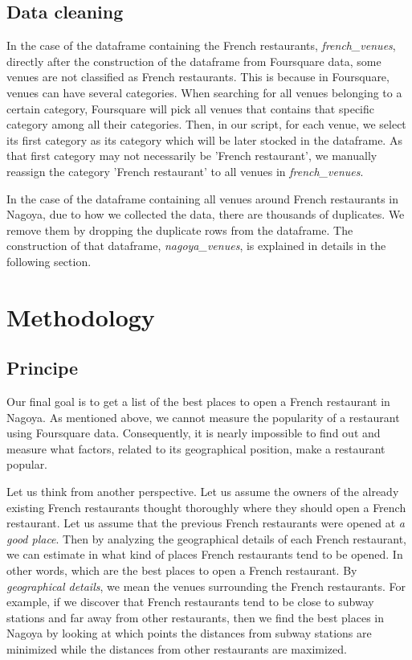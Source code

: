 \documentclass[12pt,a4paper]{article}
\begin{document}
\subsection{Data cleaning}

In the case of the dataframe containing the French restaurants, \textit{french\_venues}, directly after the construction of the dataframe from Foursquare data, some venues are not classified as French restaurants. This is because in Foursquare, venues can have several categories. When searching for all venues belonging to a certain category, Foursquare will pick all venues that contains that specific category among all their categories. Then, in our script, for each venue, we select its first category as its category which will be later stocked in the dataframe. As that first category may not necessarily be 'French restaurant', we manually reassign the category 'French restaurant' to all venues in \textit{french\_venues}.

\medskip

In the case of the dataframe containing all venues around French restaurants in Nagoya, due to how we collected the data, there are thousands of duplicates. We remove them by dropping the duplicate rows from the dataframe. The construction of that dataframe, \textit{nagoya\_venues}, is explained in details in the following section.

\section{Methodology}

\subsection*{Principe}

Our final goal is to get a list of the best places to open a French restaurant in Nagoya. As mentioned above, we cannot measure the popularity of a restaurant using Foursquare data. Consequently, it is nearly impossible to find out and measure what factors, related to its geographical position, make a restaurant popular. 

\medskip

Let us think from another perspective. Let us assume the owners of the already existing French restaurants thought thoroughly where they should open a French restaurant. Let us assume that the previous French restaurants were opened at \textit{a good place}. Then by analyzing the geographical details of each French restaurant, we can estimate in what kind of places French restaurants tend to be opened. In other words, which are the best places to open a French restaurant. By \textit{geographical details}, we mean the venues surrounding the French restaurants. For example, if we discover that French restaurants tend to be close to subway stations and far away from other restaurants, then we find the best places in Nagoya by looking at which points the distances from subway stations are minimized while the distances from other restaurants are maximized. 
\end{document}
